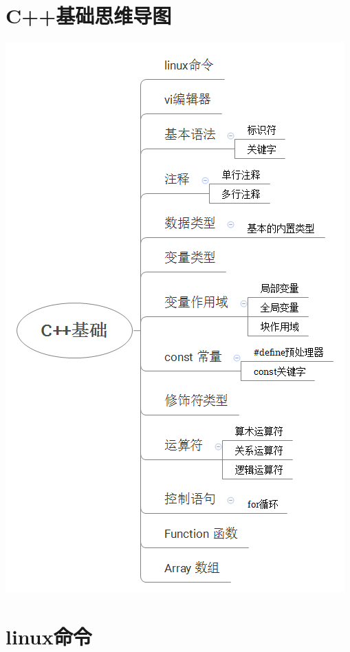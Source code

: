 \documentclass[12pt,twiside,a4paper]{ctexbook}
\numberwithin{chapter}{part}
\begin{document}
\chapter{C++基础思维导图}
\includegraphics[scale=0.6]{cpp.png}

\chapter{linux命令}
\end{document}
